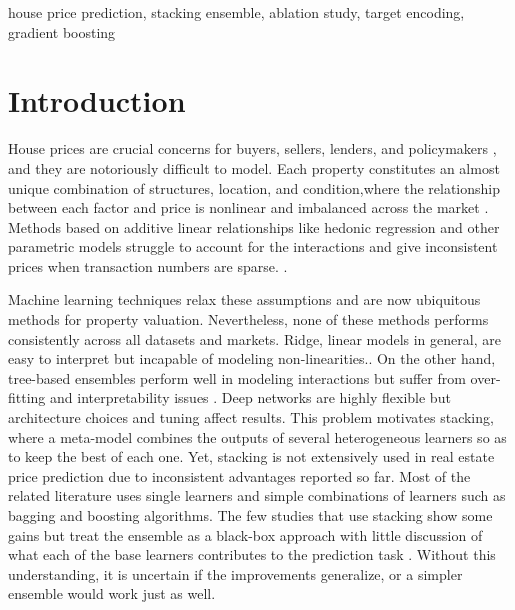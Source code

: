 \documentclass[conference]{IEEEtran}
\begin{document}
\begin{IEEEkeywords}
house price prediction, stacking ensemble, ablation study, target encoding, gradient boosting
\end{IEEEkeywords}

\section{Introduction}
House prices are crucial concerns for buyers, sellers, lenders, and policymakers \cite{KOK2014136}, and they are notoriously difficult to model. Each property constitutes an almost unique combination of  structures, location, and condition,where the relationship between each factor and price is nonlinear and imbalanced across the market \cite{35659ca8-6be8-375a-94eb-6f497d2fc083}. Methods based on additive linear relationships like hedonic regression and other parametric models struggle to account for the interactions and give inconsistent prices when transaction numbers are sparse.  \cite{KOK2014136}.

Machine learning techniques relax these assumptions and are now ubiquitous methods for property valuation. Nevertheless, none of these methods performs consistently across all datasets and markets. Ridge, linear models in general, are easy to interpret but incapable of modeling non-linearities\cite{limsombunchao2004house}.. On the other hand, tree-based ensembles perform well in modeling interactions but suffer from over-fitting and interpretability issues \cite{fan2006determinants,RICOJUAN2021114590} . Deep networks are highly flexible but architecture choices and tuning affect results\cite{10984370,JIT2774}. This problem motivates stacking, where a meta-model combines the outputs of several heterogeneous learners so as to keep the best of each one. Yet, stacking is not extensively used in real estate price prediction due to inconsistent advantages reported so far\cite{land13091436}. Most of the related literature uses single learners and simple combinations of learners such as bagging and boosting algorithms\cite{RICOJUAN2021114590}. The few studies that use stacking show some gains but treat the ensemble as a black-box approach with little discussion of what each of the base learners contributes to the prediction task\cite{Bjrgve2025ComparingHV} . Without this understanding, it is uncertain if the improvements generalize, or a simpler ensemble would work just as well.
\end{document}
